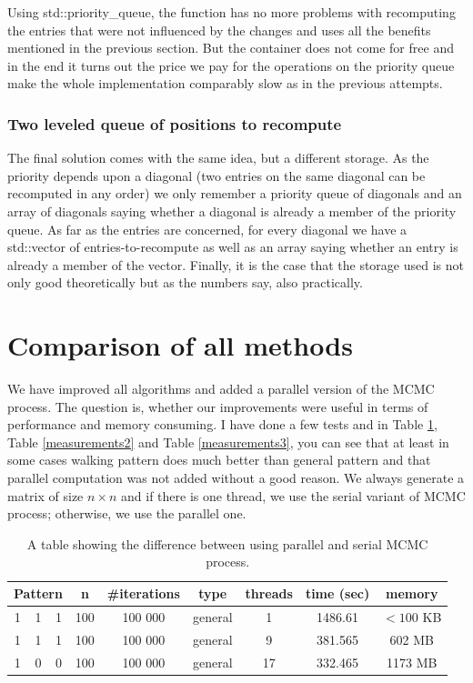 Using std::priority\_queue, the function has no more problems with recomputing the entries that were not influenced by the changes and uses all the benefits mentioned in the previous section. But the container does not come for free and in the end it turns out the price we pay for the operations on the priority queue make the whole implementation comparably slow as in the previous attempts.
\subsubsection{Two leveled queue of positions to recompute}
The final solution comes with the same idea, but a different storage. As the priority depends upon a diagonal (two entries on the same diagonal can be recomputed in any order) we only remember a priority queue of diagonals and an array of diagonals saying whether a diagonal is already a member of the priority queue. As far as the entries are concerned, for every diagonal we have a std::vector of entries-to-recompute as well as an array saying whether an entry is already a member of the vector. Finally, it is the case that the storage used is not only good theoretically but as the numbers say, also practically.

\section{Comparison of all methods}
We have improved all algorithms and added a parallel version of the MCMC process. The question is, whether our improvements were useful in terms of performance and memory consuming. I have done a few tests and in Table \ref{measurements1}, Table \ref{measurements2} and Table \ref{measurements3}, you can see that at least in some cases walking pattern does much better than general pattern and that parallel computation was not added without a good reason. We always generate a matrix of size $n\times n$ and if there is one thread, we use the serial variant of MCMC process; otherwise, we use the parallel one.
\begin{table}[]
\centering
\begin{tabular}{|ccc|c|c|c|c|c|c|}
\hline
\multicolumn{3}{|c|}{\textbf{Pattern}} & \textbf{n} & \textbf{\#iterations} & \textbf{type} & \textbf{threads} & \textbf{time (sec)} & \textbf{memory} \\ \hline
1 & 1 & 1 & 100 & 100 000 & general & 1 & 1486.61 & $<100$ KB \\ \cline{4-9} 
1 & 1 & 1 & 100 & 100 000 & general & 9 & 381.565 & 602 MB \\ \cline{4-9} 
1 & 0 & 0 & 100 & 100 000 & general & 17 & 332.465 & 1173 MB \\ \hline
\end{tabular}
\caption{A table showing the difference between using parallel and serial MCMC process.}
\label{measurements1}
\end{table}

